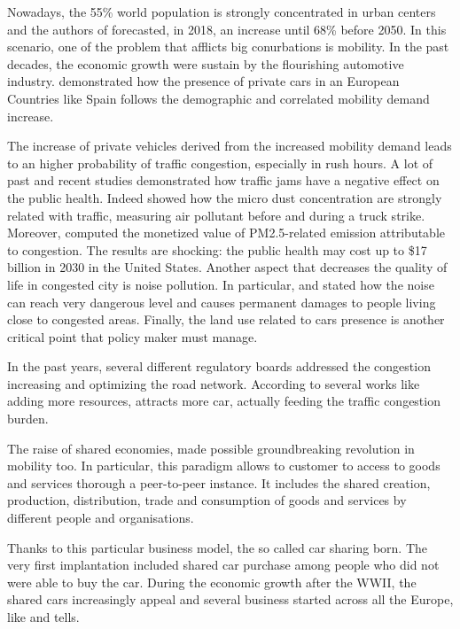 Nowadays, the 55\% world population is strongly concentrated in urban centers and the authors of \cite{UNfuture} forecasted, in 2018, an increase until 68\% before 2050. In this scenario, one of the problem that afflicts big conurbations is mobility. In the past decades, the economic growth were sustain by the flourishing automotive industry. \cite{8_matas2008changes} demonstrated how the presence of private cars in an European Countries like Spain follows the demographic and correlated mobility demand increase. 

The increase of private vehicles derived from the increased mobility demand leads to an higher probability of traffic congestion, especially in rush hours. A lot of past and recent studies demonstrated how traffic jams have a negative effect on the public health. Indeed  \cite{12_leiriao2020environmental} showed how the micro dust concentration are strongly related with traffic, measuring air pollutant before and during a truck strike. Moreover,  \cite{13_levy2010evaluation} computed the monetized value of PM2.5-related emission attributable to congestion. The results are shocking: the public health may cost up to \$17 billion in 2030 in the United States. Another aspect that decreases the quality of life in congested city is noise pollution. In particular, \cite{14_mehdi2011spatio} and \cite{15_jacyna2017noise} stated how the noise can reach very dangerous level and causes permanent damages to people living close to congested areas. Finally, the land use  related to cars presence is another critical point that policy maker must manage.

In the past years,  several different regulatory boards addressed the congestion increasing and optimizing the road network. According to several works like \cite{10_sweet2011does, 16_hymel2010induced, 17_naess2012traffic} adding more resources, attracts more car, actually feeding the traffic congestion burden.

The raise of shared economies, made possible groundbreaking revolution in mobility too. In particular, this paradigm allows to customer to  access to  goods and services thorough a peer-to-peer instance.  It includes the shared creation, production, distribution, trade and consumption of goods and services by different people and organisations. 

Thanks to this particular business model, the so called car sharing born. The very first implantation included shared car purchase among people who did not were able to buy the car. During the economic growth after the WWII, the shared cars increasingly appeal and several business started across all the Europe, like \cite{4_shaheen1999short} and \cite{5_shaheen1998carsharing} tells.

